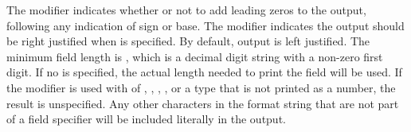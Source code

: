 The  modifier indicates whether or not to add leading zeros to the output,
following any indication of sign or base.
The  modifier indicates the output should be right justified when  is specified.
By default, output is left justified.
The minimum field length is , which is a decimal digit string
with a non-zero first digit.
If no  is specified, the actual length needed to print the field will be used.
If the  modifier is used with  of , {},
, {}, or a type that is not printed as a number, the
result is unspecified.
Any other characters in the format string that are not part of a field specifier will be included literally
in the output.


